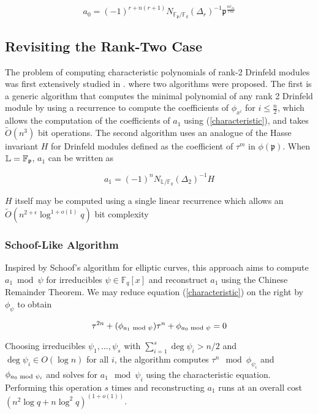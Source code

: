 \documentclass[sigconf]{acmart}
\newcommand{\F}{\mathbb{F}}
\renewcommand{\L}{\mathbb{L}}
\newcommand{\frakp}{\mathfrak{p}}
\begin{document}
\begin{equation}\label{norm}
    a_0 = (-1)^{r + n(r+1)}N_{\F_{\mathfrak{p}}/\F_q}(\Delta_r)^{-1} \mathfrak{p}^{ \frac{n r_m}{ r m}}
\end{equation}

\subsection{Revisiting the Rank-Two Case}

The problem of computing characteristic polynomials of rank-2 Drinfeld modules was first extensively studied in \cite{gekeler}.  where two algorithms were proposed. The first is a generic algorithm that computes the minimal polynomial of any rank 2 Drinfeld module by using a recurrence to compute the coefficients of $\phi_{x^i}$ for $i \leq \frac{n}{2}$, which allows the computation of the coefficients of $a_1$ using (\ref{characteristic}), and takes $\tilde{O}(n^3)$ bit operations. The second algorithm uses an analogue of the Hasse invariant $H$ for Drinfeld modules defined as the coefficient of $\tau^m$ in $\phi(\frakp)$. When $\L = \F_{\frak{p}}$, $a_1$ can be written as

\begin{equation*}
    a_1 = (-1)^n N_{\L/\F_q}(\Delta_2)^{-1}H
\end{equation*}

$H$ itself may be computed using a single linear recurrence which allows an $\tilde{O}(n^{2 + \epsilon} \log^{1 + o(1)} q)$ bit complexity

\subsubsection{Schoof-Like Algorithm} Inspired by Schoof's algorithm for elliptic curves, this approach aims to compute $a_1 \bmod \psi$ for irreducibles $\psi \in \F_q[x]$ and reconstruct $a_1$ using the Chinese Remainder Theorem. We may reduce equation (\ref{characteristic}) on the right by $\phi_{\psi}$ to obtain

\begin{equation*}
    \tau^{2n} + (\phi_{a_1 \textnormal{ mod } \psi}) \tau^n + \phi_{a_0 \textnormal{ mod } \psi} = 0
\end{equation*}

Choosing irreducibles $\psi_1, \ldots, \psi_s$ with $\sum_{i=1}^s \deg \psi_i > n/2$ and $\deg \psi_i \in O(\log n)$ for all $i$, the algorithm computes $\tau^n \mod \phi_{\psi_i}$ and $\phi_{a_0 \textnormal{ mod } \psi_i}$ and solves for $a_1 \mod \psi_i$ using the characteristic equation. Performing this operation $s$ times and reconstructing $a_1$ runs at an overall cost $(n^2\log q + n \log^2 q)^{(1 + o(1))}$.
\end{document}
